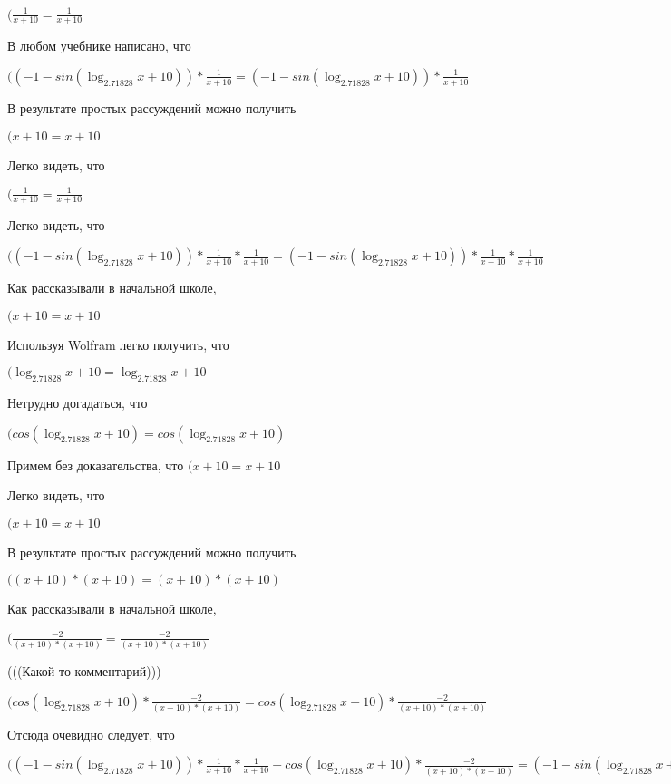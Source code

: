 \documentclass[12pt,a4paper,fleqn]{article}
\theoremstyle{definition}
\begin{document}
$(\frac{ 1 }{ x  +  10 }
 = \frac{ 1 }{ x  +  10 }
$

В любом учебнике написано, что

$(( -1  - sin(\log_{ 2.71828 }{ x  +  10 })) * \frac{ 1 }{ x  +  10 }
 = ( -1  - sin(\log_{ 2.71828 }{ x  +  10 })) * \frac{ 1 }{ x  +  10 }
$

В результате простых рассуждений можно получить

$( x  +  10  =  x  +  10 $

Легко видеть, что

$(\frac{ 1 }{ x  +  10 }
 = \frac{ 1 }{ x  +  10 }
$

Легко видеть, что

$(( -1  - sin(\log_{ 2.71828 }{ x  +  10 })) * \frac{ 1 }{ x  +  10 }
 * \frac{ 1 }{ x  +  10 }
 = ( -1  - sin(\log_{ 2.71828 }{ x  +  10 })) * \frac{ 1 }{ x  +  10 }
 * \frac{ 1 }{ x  +  10 }
$

Как рассказывали в начальной школе,

$( x  +  10  =  x  +  10 $

Используя Wolfram легко получить, что

$(\log_{ 2.71828 }{ x  +  10 } = \log_{ 2.71828 }{ x  +  10 }$

Нетрудно догадаться, что

$(cos(\log_{ 2.71828 }{ x  +  10 }) = cos(\log_{ 2.71828 }{ x  +  10 })$

Примем без доказательства, что
$( x  +  10  =  x  +  10 $

Легко видеть, что

$( x  +  10  =  x  +  10 $

В результате простых рассуждений можно получить

$(( x  +  10 ) * ( x  +  10 ) = ( x  +  10 ) * ( x  +  10 )$

Как рассказывали в начальной школе,

$(\frac{ -2 }{( x  +  10 ) * ( x  +  10 )}
 = \frac{ -2 }{( x  +  10 ) * ( x  +  10 )}
$

(((Какой-то комментарий)))

$(cos(\log_{ 2.71828 }{ x  +  10 }) * \frac{ -2 }{( x  +  10 ) * ( x  +  10 )}
 = cos(\log_{ 2.71828 }{ x  +  10 }) * \frac{ -2 }{( x  +  10 ) * ( x  +  10 )}
$

Отсюда очевидно следует, что

$(( -1  - sin(\log_{ 2.71828 }{ x  +  10 })) * \frac{ 1 }{ x  +  10 }
 * \frac{ 1 }{ x  +  10 }
 + cos(\log_{ 2.71828 }{ x  +  10 }) * \frac{ -2 }{( x  +  10 ) * ( x  +  10 )}
 = ( -1  - sin(\log_{ 2.71828 }{ x  +  10 })) * \frac{ 1 }{ x  +  10 }
 * \frac{ 1 }{ x  +  10 }
 + cos(\log_{ 2.71828 }{ x  +  10 }) * \frac{ -2 }{( x  +  10 ) * ( x  +  10 )}
$
\end{document}
